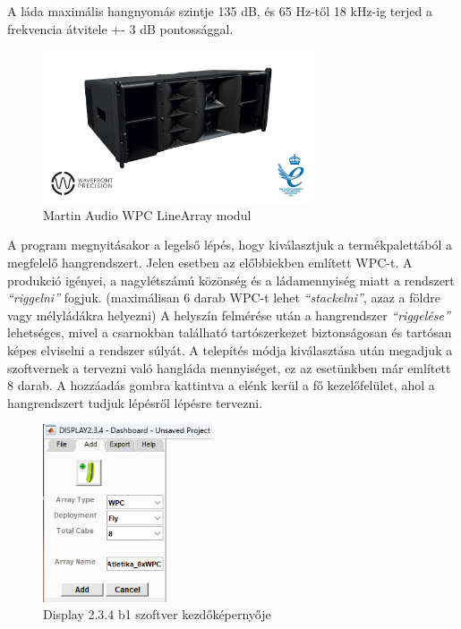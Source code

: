 A láda maximális hangnyomás szintje 135 dB, és 65 Hz-től 18 kHz-ig terjed a frekvencia átvitele +- 3 dB pontossággal. \cite{MARTINAUDIOWPC}
\begin{figure}[H]
    \centering
    \includegraphics[width=80mm, keepaspectratio]{figures/wpc_front_view.jpg}
    \caption{Martin Audio WPC LineArray modul}\label{fig:wpc}
\end{figure}
A program megnyitásakor a legelső lépés, hogy kiválasztjuk a termékpalettából a megfelelő hangrendszert. 
Jelen esetben az előbbiekben említett WPC-t. A produkció igényei, a nagylétszámú közönség és a ládamennyiség miatt a rendszert
\textit{``riggelni''} fogjuk. (maximálisan 6 darab WPC-t lehet \textit{``stackelni''}, azaz a földre vagy mélyládákra helyezni)
A helyszín felmérése után a hangrendszer \textit{``riggelése''} lehetséges, mivel a csarnokban található tartószerkezet biztonságosan
és tartósan képes elviselni a rendszer súlyát.
A telepítés módja kiválasztása után megadjuk a szoftvernek a tervezni való hangláda mennyiséget, ez az esetünkben már említett 8 darab.
A hozzáadás gombra kattintva a elénk kerül a fő kezelőfelület, ahol a hangrendszert tudjuk lépésről lépésre tervezni.
\begin{figure}[H]
    \centering
    \includegraphics[width=50mm, keepaspectratio]{figures/display_wpc_0.png}
    \caption{Display 2.3.4 b1 szoftver kezdőképernyője}\label{fig:display_wpc_0}
\end{figure}
